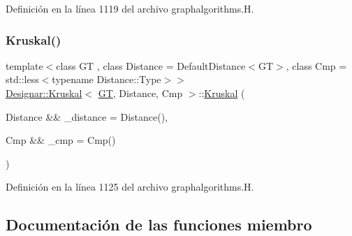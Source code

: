 Definición en la línea 1119 del archivo graphalgorithms.\+H.

\mbox{\label{class_designar_1_1_kruskal_ae1108aacf254cb652fa16a8ba398e685}} 
\subsubsection{\texorpdfstring{Kruskal()}{Kruskal()}\hspace{0.1cm}{\footnotesize\ttfamily [2/2]}}
{\footnotesize\ttfamily template$<$class GT , class Distance  = Default\+Distance$<$\+G\+T$>$, class Cmp  = std\+::less$<$typename Distance\+::\+Type$>$$>$ \\
\hyperlink{class_designar_1_1_kruskal}{Designar\+::\+Kruskal}$<$ \hyperlink{demo-buildgraph_8_c_a3001c40d2c31ca87ed96cd7d1334a55e}{GT}, Distance, Cmp $>$\+::\hyperlink{class_designar_1_1_kruskal}{Kruskal} (\begin{DoxyParamCaption}\item[{Distance \&\&}]{\+\_\+distance = {\ttfamily Distance()},  }\item[{Cmp \&\&}]{\+\_\+cmp = {\ttfamily Cmp()} }\end{DoxyParamCaption})\hspace{0.3cm}{\ttfamily [inline]}}



Definición en la línea 1125 del archivo graphalgorithms.\+H.



\subsection{Documentación de las funciones miembro}
\mbox{\label{class_designar_1_1_kruskal_ab5641dc38fc6385a0af6a82f8458b15b}} 
